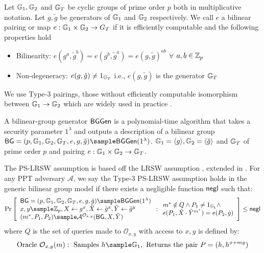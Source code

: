 \begin{definition}\label{bggroup}
Let $\mathbb{G}_1, \mathbb{G}_2$ and $\mathbb{G}_T$ be cyclic groups of prime order $p$ both in multiplicative notation. Let $g, \tilde{g}$ be generators of $\mathbb{G}_1$ and $\mathbb{G}_2$ respectively. We call $e$ a bilinear pairing or map $e : \mathbb{G}_1 \times \mathbb{G}_2 \to G_T$ if it is efficiently computable and the following properties hold
\begin{itemize}
    \item Bilinearity: $e(g^a, \tilde{g}^b) = e(g^b, \tilde{g}^a) = e(g,\tilde{g})^{ab}$ $\forall$ $a,b \in \mathbb{Z}_p$
    \item Non-degeneracy: $e(g,\tilde{g}) \neq 1_{\mathbb{G}_T}$ i.e., $e(g,\tilde{g})$ is the generator $\mathbb{G}_T$
\end{itemize}
We use Type-3 pairings, those without efficiently computable isomorphism between $\mathbb{G}_1 \to \mathbb{G}_2$ which are widely used in practice \cite{DBLP:journals/iacr/ChatterjeeM09}.
    
\end{definition}

\begin{definition}\label{bggenerator}
    A bilinear-group generator \cite{fuchsbauer_structure-preserving_2019} $\mathsf{BGGen}$ is a polynomial-time algorithm that takes a security parameter $1^\lambda$ and outputs a description of a bilinear group $\BG = (p, \G_1, \G_2, \G_T, e, g, \tilde{g}) \sample \BGGen(1^\lambda)$. $\mathbb{G}_1 = \langle g \rangle, \mathbb{G}_2 = \langle \tilde{g} \rangle $ and $\mathbb{G}_T$ of prime order $p$ and pairing $e : \mathbb{G}_1 \times \mathbb{G}_2 \to \mathbb{G}_T$.
\end{definition}

\begin{definition}\label{def:pslrsw}
The PS-LRSW assumption is based off the LRSW assumption \cite{goos_pseudonym_2000}, extended in \cite{sako_short_2016}. 
For any PPT adversary $\mathcal{A}$, we say the Type-3 PS-LRSW  assumption holds in the generic bilinear group model if there exists a negligible function $\mathsf{negl}$ such that:
$$\Pr\left[\begin{array}{l}
    \BG = (p, \G_1, \G_2, \G_T, e, g, \tilde{g}) \sample \BGGen(1^\lambda) \\
    x,y \sample \Z_p, X \gets g^x, \tilde{X} \gets \tilde{g}^x, \tilde{Y} \gets \tilde{g}^y \\
    (m^*, P_1, P_2) \sample \mathcal{A}^{\mathcal{O}_{x,y}}(\BG, X, \tilde{Y})
\end{array} : \begin{array}{l}
    m^* \notin Q \land P_1 \neq 1_{\G_1} \land \\
    e(P_1, \tilde{X} \cdot \tilde{Y}^{m^*}) = e(P_2, \tilde{g})
\end{array}\right] \leq \negl$$
where $Q$ is the set of queries made to $\mathcal{O}_{x,y}$ with access to $x,y$ is defined by:
\[
\text{Oracle }\mathcal{O}_{x,y}(m): \text{ Samples } h \sample \G_1, \text{ Returns the pair } P = (h, h^{x+my})
\]

\end{definition}







